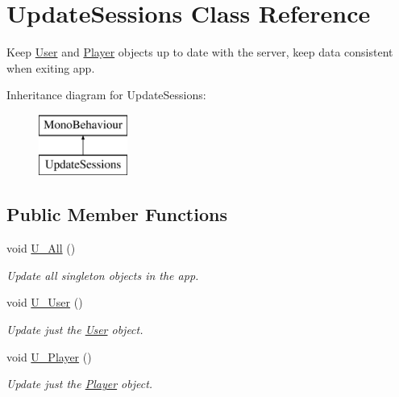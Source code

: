 \hypertarget{class_update_sessions}{}\section{Update\+Sessions Class Reference}
\label{class_update_sessions}


Keep \mbox{\hyperlink{class_user}{User}} and \mbox{\hyperlink{class_player}{Player}} objects up to date with the server, keep data consistent when exiting app.  


Inheritance diagram for Update\+Sessions\+:\begin{figure}[H]
\begin{center}
\leavevmode
\includegraphics[height=2.000000cm]{class_update_sessions}
\end{center}
\end{figure}
\subsection*{Public Member Functions}
\begin{DoxyCompactItemize}
\item 
\mbox{\label{class_update_sessions_a0ea698e5b708671e7ba25a160b325833}} 
void \mbox{\hyperlink{class_update_sessions_a0ea698e5b708671e7ba25a160b325833}{U\+\_\+\+All}} ()
\begin{DoxyCompactList}\small\item\em Update all singleton objects in the app. \end{DoxyCompactList}\item 
\mbox{\label{class_update_sessions_adf570975af9bca48413a5d6b0cbf24b1}} 
void \mbox{\hyperlink{class_update_sessions_adf570975af9bca48413a5d6b0cbf24b1}{U\+\_\+\+User}} ()
\begin{DoxyCompactList}\small\item\em Update just the \mbox{\hyperlink{class_user}{User}} object. \end{DoxyCompactList}\item 
\mbox{\label{class_update_sessions_a888b2a028e131e41ea7e34607c0a5d45}} 
void \mbox{\hyperlink{class_update_sessions_a888b2a028e131e41ea7e34607c0a5d45}{U\+\_\+\+Player}} ()
\begin{DoxyCompactList}\small\item\em Update just the \mbox{\hyperlink{class_player}{Player}} object. \end{DoxyCompactList}\end{DoxyCompactItemize}
